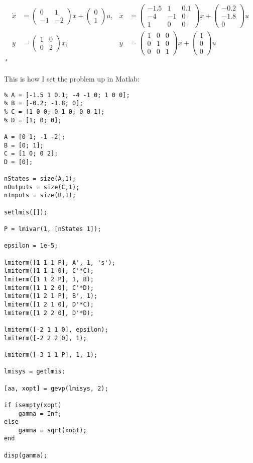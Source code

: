 \documentclass[12pt, letterpaper]{article}
\begin{document}
\[
\begin{aligned}
\dot{x} &= \begin{pmatrix}
0 & 1 \\
-1 & -2
\end{pmatrix} x + \begin{pmatrix}
0 \\
1
\end{pmatrix} u, & 
\dot{x} &= \begin{pmatrix}
-1.5 & 1 & 0.1 \\
-4 & -1 & 0 \\
1 & 0 & 0
\end{pmatrix} x + \begin{pmatrix}
-0.2 \\
-1.8 \\
0
\end{pmatrix} u \\
y &= \begin{pmatrix}
1 & 0 \\
0 & 2
\end{pmatrix} x, & 
y &= \begin{pmatrix}
1 & 0 & 0 \\
0 & 1 & 0 \\
0 & 0 & 1
\end{pmatrix} x + \begin{pmatrix}
1 \\
0 \\
0
\end{pmatrix} u
\end{aligned}
\]
\textit{"}

This is how I set the problem up in Matlab:

\begin{lstlisting}
% A = [-1.5 1 0.1; -4 -1 0; 1 0 0];
% B = [-0.2; -1.8; 0];
% C = [1 0 0; 0 1 0; 0 0 1];
% D = [1; 0; 0];

A = [0 1; -1 -2];
B = [0; 1];
C = [1 0; 0 2];
D = [0];

nStates = size(A,1);
nOutputs = size(C,1);
nInputs = size(B,1);

setlmis([]);

P = lmivar(1, [nStates 1]);

epsilon = 1e-5;

lmiterm([1 1 1 P], A', 1, 's');
lmiterm([1 1 1 0], C'*C);
lmiterm([1 1 2 P], 1, B);
lmiterm([1 1 2 0], C'*D);
lmiterm([1 2 1 P], B', 1);
lmiterm([1 2 1 0], D'*C);
lmiterm([1 2 2 0], D'*D);

lmiterm([-2 1 1 0], epsilon);
lmiterm([-2 2 2 0], 1);

lmiterm([-3 1 1 P], 1, 1);

lmisys = getlmis;

[aa, xopt] = gevp(lmisys, 2);

if isempty(xopt)
    gamma = Inf;
else
    gamma = sqrt(xopt);
end

disp(gamma);    
\end{lstlisting}
\end{document}
